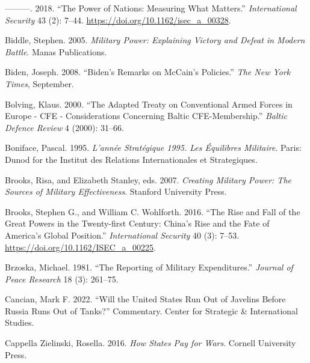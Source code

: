 \documentclass[
]{article}
\newlength{\cslhangindent}
\newlength{\cslentryspacingunit} %
\newenvironment{CSLReferences}[2] %
 {%
  \setlength{\parindent}{0pt}
  \ifodd #1
  \let\oldpar\par
  \def\par{\hangindent=\cslhangindent\oldpar}
  \fi
  \setlength{\parskip}{#2\cslentryspacingunit}
 }%
 {}
\begin{document}
\begin{CSLReferences}{1}{0}
\leavevmode{}%
---------. 2018. {``The {Power} of {Nations}: {Measuring What Matters}.''} \emph{International Security} 43 (2): 7--44. \url{https://doi.org/10.1162/isec_a_00328}.

\leavevmode{}%
Biddle, Stephen. 2005. \emph{Military {Power}: {Explaining Victory} and {Defeat} in {Modern Battle}}. {Manas Publications}.

\leavevmode{}%
Biden, Joseph. 2008. {``Biden's {Remarks} on {McCain}'s {Policies}.''} \emph{The New York Times}, September.

\leavevmode{}%
Bolving, Klaus. 2000. {``The {Adapted Treaty} on {Conventional Armed Forces} in {Europe} - {CFE} - {Considerations} Concerning {Baltic CFE-Membership}.''} \emph{Baltic Defence Review} 4 (2000): 31--66.

\leavevmode{}%
Boniface, Pascal. 1995. \emph{L'année {Stratégique} 1995. {Les} Équilibres Militaire}. {Paris}: {Dunod for the Institut des Relations Internationales et Strategiques}.

\leavevmode{}%
Brooks, Risa, and Elizabeth Stanley, eds. 2007. \emph{Creating {Military Power}: {The Sources} of {Military Effectiveness}}. {Stanford University Press}.

\leavevmode{}%
Brooks, Stephen G., and William C. Wohlforth. 2016. {``The {Rise} and {Fall} of the {Great Powers} in the {Twenty-first Century}: {China}'s {Rise} and the {Fate} of {America}'s {Global Position}.''} \emph{International Security} 40 (3): 7--53. \url{https://doi.org/10.1162/ISEC_a_00225}.

\leavevmode{}%
Brzoska, Michael. 1981. {``The Reporting of Military Expenditures.''} \emph{Journal of Peace Research} 18 (3): 261--75.

\leavevmode{}%
Cancian, Mark F. 2022. {``Will the {United States Run Out} of {Javelins Before Russia Runs Out} of {Tanks}?''} Commentary. {Center for Strategic \& International Studies}.

\leavevmode{}%
Cappella Zielinski, Rosella. 2016. \emph{How {States Pay} for {Wars}}. {Cornell University Press}.


\end{CSLReferences}
\end{document}
